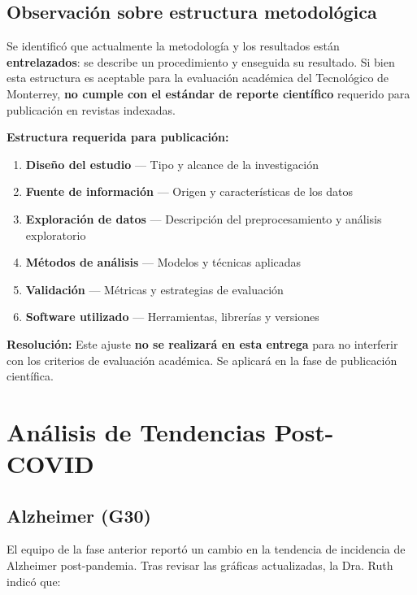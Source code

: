 \documentclass[11pt, a4paper]{article}
\begin{document}
\subsection{Observación sobre estructura metodológica}

Se identificó que actualmente la metodología y los resultados están \textbf{entrelazados}: se describe un procedimiento y enseguida su resultado. Si bien esta estructura es aceptable para la evaluación académica del Tecnológico de Monterrey, \textbf{no cumple con el estándar de reporte científico} requerido para publicación en revistas indexadas.

\textbf{Estructura requerida para publicación:}
\begin{enumerate}[leftmargin=1.5cm]
    \item \textbf{Diseño del estudio} --- Tipo y alcance de la investigación
    \item \textbf{Fuente de información} --- Origen y características de los datos
    \item \textbf{Exploración de datos} --- Descripción del preprocesamiento y análisis exploratorio
    \item \textbf{Métodos de análisis} --- Modelos y técnicas aplicadas
    \item \textbf{Validación} --- Métricas y estrategias de evaluación
    \item \textbf{Software utilizado} --- Herramientas, librerías y versiones
\end{enumerate}

\textbf{Resolución:} Este ajuste \textbf{no se realizará en esta entrega} para no interferir con los criterios de evaluación académica. Se aplicará en la fase de publicación científica.

\vspace{0.5cm}

\section{Análisis de Tendencias Post-COVID}

\subsection{Alzheimer (G30)}

El equipo de la fase anterior reportó un cambio en la tendencia de incidencia de Alzheimer post-pandemia. Tras revisar las gráficas actualizadas, la Dra. Ruth indicó que:
\end{document}
